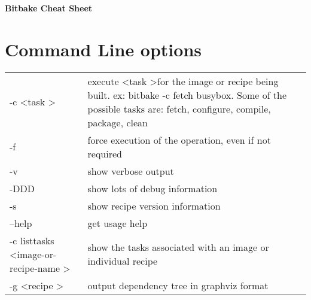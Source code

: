 \documentclass[10pt,a4paper,landscape]{article}
\newcommand*\keystroke[1]{%
  \tikz[baseline=(key.base)]
    \node[%
      draw,
      fill=white,
      drop shadow={shadow xshift=0.25ex,shadow yshift=-0.25ex,fill=black,opacity=0.75},
      rectangle,
      rounded corners=2pt,
      inner sep=1pt,
      line width=0.5pt,
      font=\scriptsize\sffamily
    ](key) {~#1~\strut}
  ;
}
\renewcommand{\familydefault}{\sfdefault}
\begin{document}

\newcommand{\ret}{\keystroke{$\hookleftarrow$}}
\newcommand{\shift}{\keystroke{$\Uparrow~$}}
\newcommand{\alt}{\keystroke{Alt}}
\newcommand{\up}{\keystroke{$\uparrow$}}
\newcommand{\down}{\keystroke{$\downarrow$}}
\newcommand{\bkspc}{\keystroke{$\longmapsfrom$}}
\newcommand{\ctrl}[1]{\texttt{\keystroke{Ctrl}#1}}

\raggedright
\footnotesize
\begin{multicols}{2}

\begin{center}
     \Large{\textbf{Bitbake Cheat Sheet}} \\
\end{center}


\section{Command Line options}

\begin{tabular}{p{5cm}p{\linewidth - 5.9cm}}
-c \textless task \textgreater & execute \textless task \textgreater for the image or recipe being built. ex: bitbake -c fetch busybox. Some of the possible tasks are: fetch, configure, compile, package, clean \\
-f & force execution of the operation, even if not required \\
-v & show verbose output \\
-DDD & show lots of debug information \\
-s & show recipe version information \\
--help & get usage help \\
-c listtasks \textless image-or-recipe-name \textgreater & show the tasks associated with an image or individual recipe \\
-g \textless recipe \textgreater & output dependency tree in graphviz format \\
\end{tabular}


\end{multicols}
\end{document}
